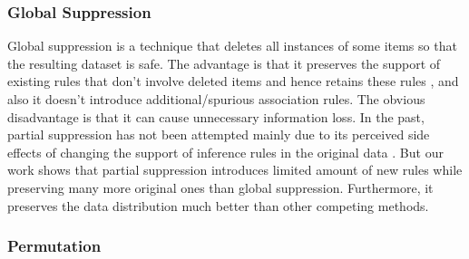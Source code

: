 \subsubsection{Global Suppression}

Global suppression is a technique that deletes all instances of some items
so that the resulting dataset is safe.
The advantage is that it preserves the support of
existing rules that don't involve deleted items and hence retains these rules
\cite{Xu:2008:ATD}, and also it doesn't introduce
additional/spurious association rules.
The obvious disadvantage is that it can cause unnecessary
information loss. In the past, partial suppression
has not been attempted mainly due to its perceived side effects of
changing the support of inference rules in the original data
\cite{Xu:2008:ATD,Cao:2010:rho,tkde:VerykiosEBSD04:ARH,tkde:WuCC07:hiding}.
But our work shows that partial suppression introduces limited
amount of new rules while preserving many more original ones than
global suppression. Furthermore,
it preserves the data distribution much better than
other competing methods.

\subsubsection{Permutation}

